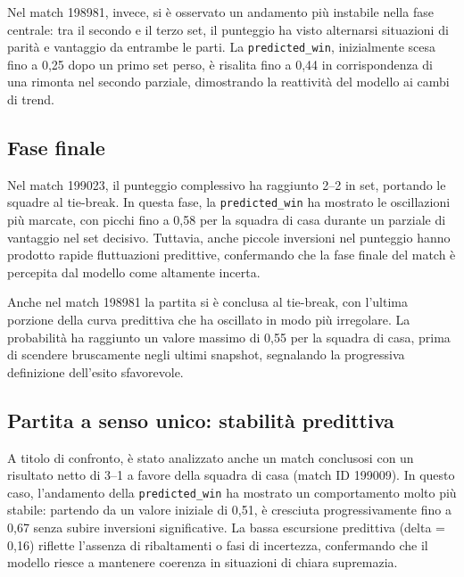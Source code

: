 \documentclass[a4paper,12pt]{report}
\begin{document}
Nel match 198981, invece, si è osservato un andamento più instabile nella fase centrale: tra il secondo e il terzo set, il punteggio ha visto alternarsi situazioni di parità e vantaggio da entrambe le parti. La \texttt{predicted\_win}, inizialmente scesa fino a 0{,}25 dopo un primo set perso, è risalita fino a 0{,}44 in corrispondenza di una rimonta nel secondo parziale, dimostrando la reattività del modello ai cambi di trend.

\subsection*{Fase finale}

Nel match 199023, il punteggio complessivo ha raggiunto 2–2 in set, portando le squadre al tie-break. In questa fase, la \texttt{predicted\_win} ha mostrato le oscillazioni più marcate, con picchi fino a 0{,}58 per la squadra di casa durante un parziale di vantaggio nel set decisivo. Tuttavia, anche piccole inversioni nel punteggio hanno prodotto rapide fluttuazioni predittive, confermando che la fase finale del match è percepita dal modello come altamente incerta.

Anche nel match 198981 la partita si è conclusa al tie-break, con l’ultima porzione della curva predittiva che ha oscillato in modo più irregolare. La probabilità ha raggiunto un valore massimo di 0{,}55 per la squadra di casa, prima di scendere bruscamente negli ultimi snapshot, segnalando la progressiva definizione dell’esito sfavorevole.

\subsection*{Partita a senso unico: stabilità predittiva}

A titolo di confronto, è stato analizzato anche un match conclusosi con un risultato netto di 3–1 a favore della squadra di casa (match ID 199009). In questo caso, l’andamento della \texttt{predicted\_win} ha mostrato un comportamento molto più stabile: partendo da un valore iniziale di 0{,}51, è cresciuta progressivamente fino a 0{,}67 senza subire inversioni significative. La bassa escursione predittiva (delta = 0{,}16) riflette l’assenza di ribaltamenti o fasi di incertezza, confermando che il modello riesce a mantenere coerenza in situazioni di chiara supremazia.
\end{document}
